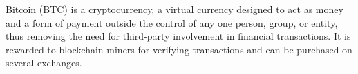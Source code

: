\begin{foreignabstract}

Bitcoin (BTC) is a cryptocurrency, a virtual currency designed to act as money and a form of payment outside the control of any one person, group, or entity, thus removing the need for third-party involvement in financial transactions. It is rewarded to blockchain miners for verifying transactions and can be purchased on several exchanges.

\end{foreignabstract}
